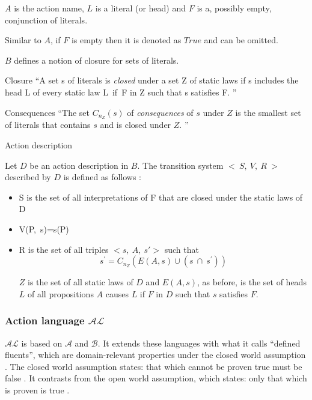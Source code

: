 $A$ is the action name, $L$ is a literal (or head) and $F$ is a, possibly empty, conjunction of literals.

Similar to $A$, if $F$ is empty then it is denoted as $True$ and can be omitted.

$B$ defines a notion of closure for sets of literals.

\begin{definition}{Closure}
    ``A set s of literals is \textit{closed} under a set Z of static laws if s includes the head L of every static law L\ if\ F in Z such that s satisfies F.
\cite{gelfond_action_1998}''
\end{definition}

\begin{definition}{Consequences}
    ``The set $C_{n_Z}\left(s\right)$ of \textit{consequences} of $s$ under $Z$ is the smallest set of literals that contains $s$ and is closed under $Z$.
    \cite{gelfond_action_1998}''
\end{definition}

\begin{definition}{Action description}

    Let $D$ be an action description in $B$.
    The transition system $<\ S,\ V,\ R\ >$ described by $D$ is defined as follows \cite{gelfond_action_1998}:

    \begin{itemize}
        \item S is the set of all interpretations of F that are closed under the static laws of D
        \item V(P,\ s)=s(P)
        \item R is the set of all triples $<s,\ A,\ s\prime>$ such that
            $$
            s^\prime=C_{n_Z}\left(E\left(A,s\right)\cup\left(s\ \cap\ s^\prime\right)\right)
            $$

            $ Z $ is the set of all static laws of $D$ and $E(A, s)$, as before, is the set of heads $L$ of all propositions $A$ causes $L$ if $F$ in $D$ such that $s$ satisfies $F$.
    \end{itemize}
\end{definition}

\subsubsection{Action language $ \mathcal{AL} $}
\label{subsubsec:action_language_al}

$ \mathcal{AL} $ is based on $ \mathcal{A} $ and $ \mathcal{B} $.
It extends these languages with what it calls ``defined fluents'', which are domain-relevant properties under the closed world assumption \cite{blount_architecture_2013}.
The closed world assumption states: that which cannot be proven true must be false \cite{reiter_closed_1981}.
It contrasts from the open world assumption, which states: only that which is proven is true \cite{reiter_closed_1981}.

